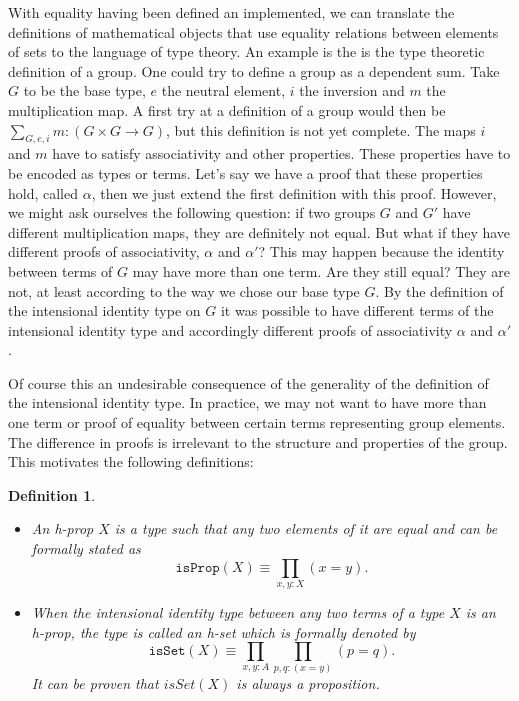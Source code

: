 \documentclass[11pt,a4paper,twoside,xetex,draft]{book}
\newcommand{\keyword}[1]{\emph{#1}\index{#1}}
\newtheorem{definition}[theorem]{Definition}
\newcommand{\op}[1]{\mathtt{#1}}
\begin{document}
With equality having been defined an implemented, we can translate the definitions of mathematical objects that use equality relations between elements of sets to the language of type theory. An example is the is the type theoretic definition of a group. One could try to define a group as a dependent sum. Take $G$ to be the base type, $e$ the neutral element, $i$ the inversion and $m$ the multiplication map. A first try at a definition of a group would then be $\sum_{G,e,i}m:(G\times G \rightarrow G)$, but this definition is not yet complete. The maps $i$ and $m$  have to satisfy associativity and other properties. These properties have to be encoded as types or terms. Let's say we have a proof that these properties hold, called $\alpha$, then we just extend the first definition with this proof. However, we might ask ourselves the following question: if two groups $G$ and $G'$ have different multiplication maps, they are definitely not equal. But what if they have different proofs of associativity, $\alpha$ and $\alpha'$? This may happen because the identity between terms of  $G$ may have more than one term. Are they still equal? They are not, at least according to the way we chose our base type $G$. By the definition of the intensional identity type on $G$ it was possible to have different terms of the intensional identity type and accordingly different proofs of associativity $\alpha$ and $\alpha'$.

Of course this an undesirable consequence of the generality of the definition of the intensional identity type. In practice, we may not want to have more than one term or proof of equality between certain terms representing group elements. The difference in proofs is irrelevant to the structure and properties of the group. This motivates the following definitions:

\begin{definition}
\begin{itemize}
\item  An \keyword{h-prop} $X$ is a type such that any two elements of it are equal and can be formally stated as $$\op{isProp}(X) \equiv \prod_{x,y:X}(x=y).$$
\item When the intensional identity type between any two terms of a type $X$ is an h-prop, the type is called an \keyword{h-set} which is formally denoted by $$\op{isSet}(X) \equiv \prod_{x,y:A}\prod_{p,q:(x=y)}(p=q).$$ It can be proven that $isSet(X)$ is always a proposition.
\end{itemize}
\end{definition}
\end{document}
